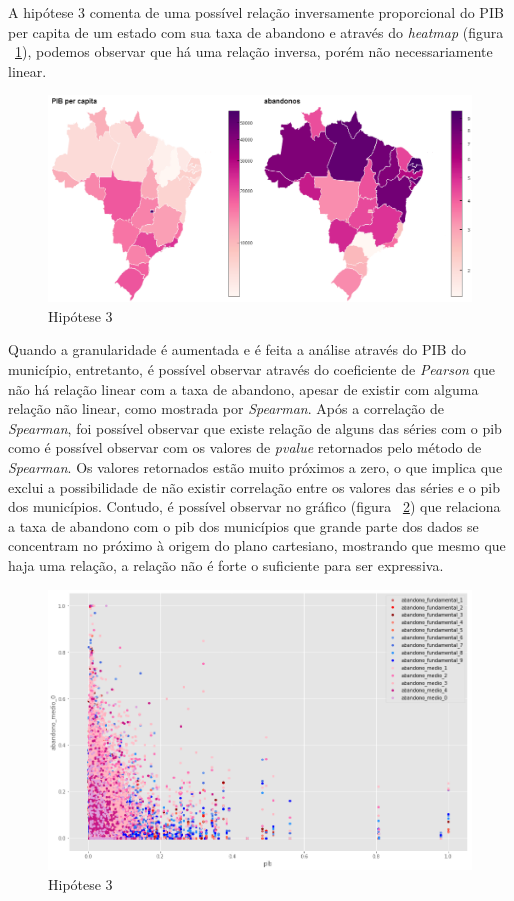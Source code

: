 \documentclass[review]{elsarticle}
\begin{document}
A hipótese 3 comenta de uma possível relação inversamente proporcional do PIB per capita de um estado com sua taxa de abandono e através do \emph{heatmap} (figura ~\ref{fig:h3}), podemos observar que há uma relação inversa, porém não necessariamente linear.\par
\begin{figure}[h!]
\includegraphics[width=350pt]{h3_graph.png}
\caption{Hipótese 3}
\label{fig:h3}
\centering
\end{figure}
Quando a granularidade é aumentada e é feita a análise através do PIB do município, entretanto, é possível observar através do coeficiente de \emph{Pearson} que não há relação linear com a taxa de abandono, apesar de existir com alguma relação não linear, como mostrada por \emph{Spearman}. Após a correlação de \emph{Spearman}, foi possível observar que existe relação de alguns das séries com o pib como é possível observar com os valores de \emph{pvalue} retornados pelo método de \emph{Spearman}.  Os valores retornados estão muito próximos a zero, o que implica que exclui a possibilidade de não existir correlação entre os valores das séries e o pib dos municípios. Contudo, é possível observar no gráfico (figura ~\ref{fig:h31}) que relaciona a taxa de abandono com o pib dos municípios que grande parte dos dados se concentram no próximo à origem do plano cartesiano, mostrando que mesmo que haja uma relação, a relação não é forte o suficiente para ser expressiva.\par
\begin{figure}[h!]
\includegraphics[width=350pt]{h3_scatter.png}
\caption{Hipótese 3}
\label{fig:h31}
\centering
\end{figure}
\end{document}
